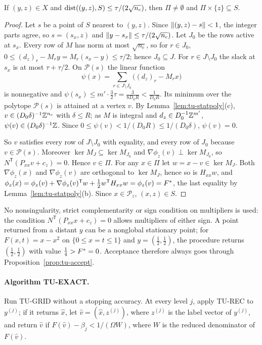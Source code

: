 \begin{lemma}\label{lem:tu-snap}
If $(y,z)\in X$ and $\operatorname{dist}((y,z),S)\le\tau/(2\sqrt{n_c})$, then $\Pi\ne\emptyset$
and $\Pi\times\{z\}\subseteq S$.
\end{lemma}

\begin{proof}
Let $s$ be a point of $S$ nearest to $(y,z)$. Since $\lVert(y,z)-s\rVert<1$, the
integer parts agree, so $s=(s_x,z)$ and $\lVert y-s_x\rVert\le\tau/(2\sqrt{n_c})$. Let
$J_0$ be the rows active at $s_x$. Every row of $M$ has norm at most $\sqrt{n_c}$,
so for $r\in J_0$, $0\le(d_z)_r-M_ry=M_r(s_x-y)\le\tau/2$; hence $J_0\subseteq J$.
For $r\in J\setminus J_0$ the slack at $s_x$ is at most $\tau+\tau/2$. On
$\mathcal P(s)$ the linear function
\[
\psi(x)=\sum_{r\in J\setminus J_0}\bigl((d_z)_r-M_rx\bigr)
\]
is nonnegative and $\psi(s_x)\le m'\cdot\frac32\tau=\frac3{8D_0R}<\frac1{D_0R}$.
Its minimum over the polytope $\mathcal P(s)$ is attained at a vertex $v$. By
Lemma~\ref{lem:tu-statpoly}(c), $v\in(D_0\delta)^{-1}\mathbb Z^{n_c}$ with $\delta\le R$; as $M$
is integral and $d_z\in D_0^{-1}\mathbb Z^{m'}$, $\psi(v)\in(D_0\delta)^{-1}\mathbb Z$. Since
$0\le\psi(v)<1/(D_0R)\le1/(D_0\delta)$, $\psi(v)=0$.

So $v$ satisfies every row of $J\setminus J_0$ with equality, and every row of
$J_0$ because $v\in\mathcal P(s)$. Moreover $\ker M_J\subseteq\ker M_{J_0}$ and
$\nabla\phi_z(v)\perp\ker M_{J_0}$, so $N^{\mathsf T}(P_{xx}v+c_z)=0$. Hence $v\in\Pi$.
For any $x\in\Pi$ let $w=x-v\in\ker M_J$. Both $\nabla\phi_z(x)$ and
$\nabla\phi_z(v)$ are orthogonal to $\ker M_J$, hence so is $H_{xx}w$, and
$\phi_z(x)=\phi_z(v)+\nabla\phi_z(v)^{\mathsf T}w+\frac12w^{\mathsf T}H_{xx}w=\phi_z(v)=F^*$,
the last equality by Lemma~\ref{lem:tu-statpoly}(b). Since $x\in\mathcal P_z$,
$(x,z)\in S$.
\end{proof}

No nonsingularity, strict complementarity or sign condition on multipliers is
used: the condition $N^{\mathsf T}(P_{xx}x+c_z)=0$ allows multipliers of either
sign. A point returned from a distant $y$ can be a nonglobal stationary point;
for $F(x,t)=x-x^2$ on $\{0\le x=t\le1\}$ and $y=(\frac12,\frac12)$, the procedure
returns $(\frac12,\frac12)$ with value $\frac14>F^*=0$. Acceptance therefore always
goes through Proposition~\ref{prop:tu-accept}.

\paragraph{Algorithm TU-EXACT.}
Run TU-GRID without a stopping accuracy. At every level $j$, apply TU-REC to
$y^{(j)}$; if it returns $\hat x$, let $\hat v=(\hat x,z^{(j)})$, where
$z^{(j)}$ is the label vector of $y^{(j)}$, and return $\hat v$ if
$F(\hat v)-\beta_j<1/(\Omega W)$, where $W$ is the reduced denominator of
$F(\hat v)$.

